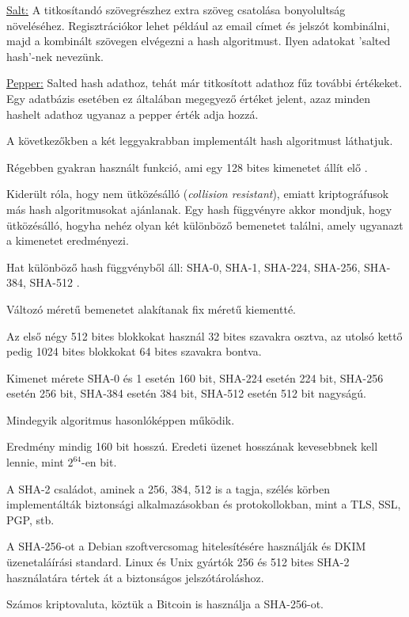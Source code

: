 \underline{Salt:} A titkosítandó szövegrészhez extra szöveg csatolása bonyolultság növeléséhez. Regisztrációkor lehet például az email címet és jelszót kombinálni, majd a kombinált szövegen elvégezni a hash algoritmust. Ilyen adatokat 'salted hash'-nek nevezünk.

\underline{Pepper:} Salted hash adathoz, tehát már titkosított adathoz fűz további értékeket. Egy adatbázis esetében ez általában megegyező értéket jelent, azaz minden hashelt adathoz ugyanaz a pepper érték adja hozzá.

A következőkben a két leggyakrabban implementált hash algoritmust láthatjuk.

Régebben gyakran használt funkció, ami egy 128 bites kimenetet állít elő \cite{gupta2014review}.

Kiderült róla, hogy nem ütközésálló (\textit{collision resistant}), emiatt kriptográfusok más hash algoritmusokat ajánlanak. Egy hash függvényre akkor mondjuk, hogy ütközésálló, hogyha nehéz olyan két különböző bemenetet találni, amely ugyanazt a kimenetet eredményezi.



Hat különböző hash függvényből áll: SHA-0, SHA-1, SHA-224, SHA-256, SHA-384, SHA-512 \cite{dang2008recommendation}.

Változó méretű bemenetet alakítanak fix méretű kiementté.

Az első négy 512 bites blokkokat használ 32 bites szavakra osztva, az utolsó kettő pedig 1024 bites blokkokat 64 bites szavakra bontva.

Kimenet mérete SHA-0 és 1 esetén 160 bit, SHA-224 esetén 224 bit, SHA-256 esetén 256 bit, SHA-384 esetén 384 bit, SHA-512 esetén 512 bit nagyságú.

Mindegyik algoritmus hasonlóképpen működik.

Eredmény mindig 160 bit hosszú. Eredeti üzenet hosszának kevesebbnek kell lennie, mint $2^{64}$-en bit.

A SHA-2 családot, aminek a 256, 384, 512 is a tagja, szélés körben implementálták biztonsági alkalmazásokban és protokollokban, mint a TLS, SSL, PGP, stb.

A SHA-256-ot a Debian szoftvercsomag hitelesítésére használják és DKIM üzenetaláírási standard. Linux és Unix gyártók 256 és 512 bites SHA-2 használatára tértek át a biztonságos jelszótároláshoz.

Számos kriptovaluta, köztük a Bitcoin is használja a SHA-256-ot.


